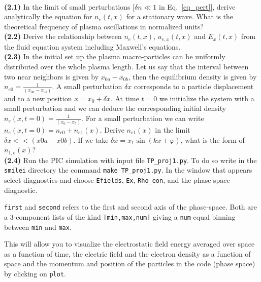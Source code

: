 \documentclass[10pt]{article}
\begin{document}
\\
{\bf (2.1)} In the limit of small perturbations [$\delta n \ll 1$ in Eq.~\eqref{eq_pert}], derive analytically the equation for $n_e(t,x)$ for a stationary wave. What is the theoretical frequency of plasma oscillations in normalized units?\\
{\bf (2.2)} Derive the relationship between $n_e(t,x)$, $u_{e,x}(t,x)$ and $E_x(t,x)$ from the fluid equation system including Maxwell's equations.\\
{\bf (2.3)} In the initial set up the plasma macro-particles  can be uniformly distributed over the whole plasma length. Let us say that the interval between two near neighbors is given by  $x_{0a}-x_{0b}$, then   the equilibrium density is given by  $n_{e0} = \frac{1}{(x_{0a}-x_{0b})}$. A small perturbation $\delta x$  corresponds to a particle displacement and to a new position  $x = x_0 +  \delta x$. At time $t=0$ we initialize the system with a small perturbation and we can deduce the corresponding initial density  $n_e(x,t=0)= \frac{1}{(x_{a}-x_{b})}$. For a small perturbation we can write  $n_e(x,t=0)=n_{e0}+n_{e1}(x)$. Derive   $n_{e1}(x)$ in the limit  $\delta x << (x0a-x0b)$. If we take  $\delta x = x_1 \sin(kx +\varphi)$, what is the form of $n_{1,e}(x)$? \\
{\bf (2.4)} Run the PIC simulation with input file \texttt{TP\_proj1.py}. To do so write in the \texttt{smilei} directory the command 
\texttt{make TP\_proj1.py}. In the window that appears select diagnostics and choose \texttt{Efields}, \texttt{Ex}, \texttt{Rho\_eon}, and the phase space diagnostic. 



\texttt{first} and \texttt{second} refers to the first and second axis of the phase-space. Both are a 3-component lists of the kind \texttt{[min,max,num]} giving a \texttt
{num} equal binning between \texttt{min} and \texttt{max}.

This will allow you to visualize the electrostatic field energy averaged over space as a function of time,  the electric field and the electron density  as a function of space and the momentum and position of the particles in the code (phase space) by clicking on \texttt{plot}.
\end{document}
